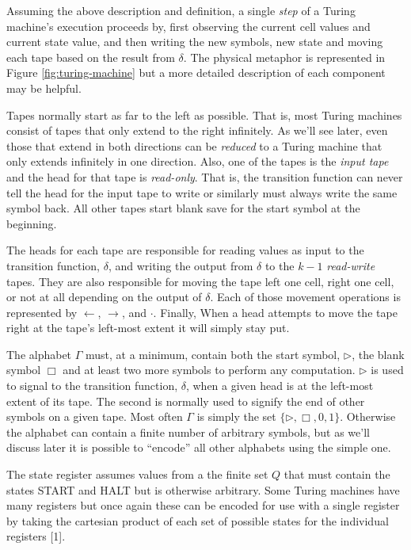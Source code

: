 \documentclass[usletter]{article}
\begin{document}
Assuming the above description and definition, a single \textit{step} of a Turing machine's execution proceeds by, first observing the current cell values and current state value, and then writing the new symbols, new state and moving each tape based on the result from $\delta$. The physical metaphor is represented in Figure \ref{fig:turing-machine} but a more detailed description of each component may be helpful.

Tapes normally start as far to the left as possible. That is, most Turing machines consist of tapes that only extend to the right infinitely. As we'll see later, even those that extend in both directions can be \textit{reduced} to a Turing machine that only extends infinitely in one direction. Also, one of the tapes is the \textit{input tape} and the head for that tape is \textit{read-only}. That is, the transition function can never tell the head for the input tape to write or similarly must always write the same symbol back. All other tapes start blank save for the start symbol at the beginning.

The heads for each tape are responsible for reading values as input to the transition function, $\delta$, and writing the output from $\delta$ to the $k-1$ \textit{read-write} tapes. They are also responsible for moving the tape left one cell, right one cell, or not at all depending on the output of $\delta$. Each of those movement operations is represented by $\leftarrow$, $\rightarrow$, and $\cdot$. Finally, When a head attempts to move the tape right at the tape's left-most extent it will simply stay put.

The alphabet $\Gamma$ must, at a minimum, contain both the start symbol, $\rhd$, the blank symbol $\Box$ and at least two more symbols to perform any computation. $\rhd$ is used to signal to the transition function, $\delta$, when a given head is at the left-most extent of its tape. The second is normally used to signify the end of other symbols on a given tape. Most often $\Gamma$ is simply the set $\{\rhd, \Box, 0, 1\}$. Otherwise the alphabet can contain a finite number of arbitrary symbols, but as we'll discuss later it is possible to ``encode'' all other alphabets using the simple one.

The state register assumes values from a the finite set $Q$ that must contain the states \textsf{START} and \textsf{HALT} but is otherwise arbitrary. Some Turing machines have many registers but once again these can be encoded for use with a single register by taking the cartesian product of each set of possible states for the individual registers [1].
\end{document}
